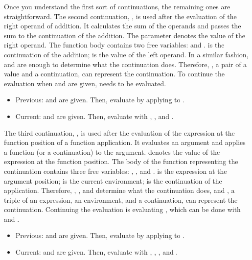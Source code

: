 Once you understand the first sort of continuations, the remaining ones are
straightforward. The second continuation, , is used after the evaluation of the right operand of addition. It
calculates the sum of the operands and passes the sum to the continuation of the
addition. The parameter  denotes the value of the right operand. The
function body contains two free variables:  and .  is
the continuation of the addition;  is the value of the left operand. In
a similar fashion,  and  are enough to determine what the
continuation does. Therefore, , a pair of a value and a
continuation, can represent the continuation. To continue the evaluation when
 and  are given,  needs
to be evaluated.

\begin{itemize}
  \item Previous:  and  are given.
  Then, evaluate  by applying  to .
  \item Current:  and  are given. Then, evaluate
   with , , and .
\end{itemize}

The third continuation, , is
used after the evaluation of the expression at the function position of
a function application. It evaluates an argument and applies a function (or
a continuation) to the argument.
 denotes the value of the expression at the function position. The body
of the function representing the continuation contains three free variables:
, , and .
 is the expression at the argument
position;  is the current environment;  is the continuation of
the application. Therefore, , ,
and  determine what the continuation does, and , a
triple of an expression, an environment, and a continuation, can represent the
continuation. Continuing the evaluation is evaluating , which can be done with  and .

\begin{itemize}
  \item Previous:  and 
  are given. Then, evaluate  by
  applying  to .
  \item Current:  and  are given. Then, evaluate
   with , ,
  , and .
\end{itemize}


